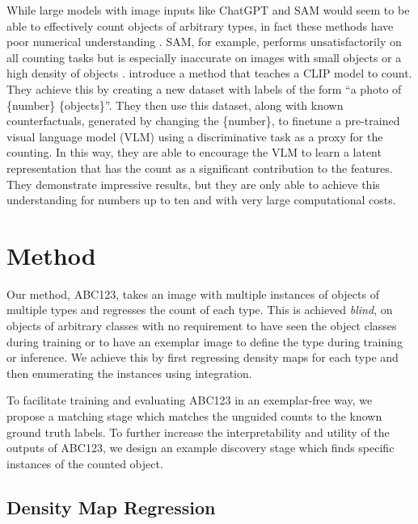 \documentclass[../thesis.tex]{subfiles}
\begin{document}
While large models with image inputs like ChatGPT \cite{openai2023gpt4} and SAM \cite{kirillov2023segany} would seem to be able to effectively count objects of arbitrary types, in fact these methods have poor numerical understanding \cite{ma2023can}. SAM, for example, performs unsatisfactorily on all counting tasks but is especially inaccurate on images with small objects or a high density of objects \cite{ma2023can}.
\citet{paiss2023countclip} introduce a method that teaches a CLIP \cite{radford2021learning} model to count. They achieve this by creating a new dataset with labels of the form ``a photo of \{number\} \{objects\}''.
They then use this dataset, along with known counterfactuals, generated by changing the \{number\}, to finetune a pre-trained visual language model (VLM) using a discriminative task as a proxy for the counting.
In this way, they are able to encourage the VLM to learn a latent representation that has the count as a significant contribution to the features.
They demonstrate impressive results, but they are only able to achieve this understanding for numbers up to ten and with very large computational costs.


\section{Method}
Our method, ABC123, takes an image with multiple instances of objects of multiple types and regresses the count of each type. This is achieved \textit{blind}, \ie on objects of arbitrary classes with no requirement to have seen the object classes during training or to have an exemplar image to define the type during training or inference.
We achieve this by first regressing density maps for each type and then enumerating the instances using integration. 

To facilitate training and evaluating ABC123 in an exemplar-free way, we propose a matching stage which matches the unguided counts to the known ground truth labels.
To further increase the interpretability and utility of the outputs of ABC123, we design an example discovery stage which finds specific instances of the counted object.





\subsection{Density Map Regression}
\end{document}
